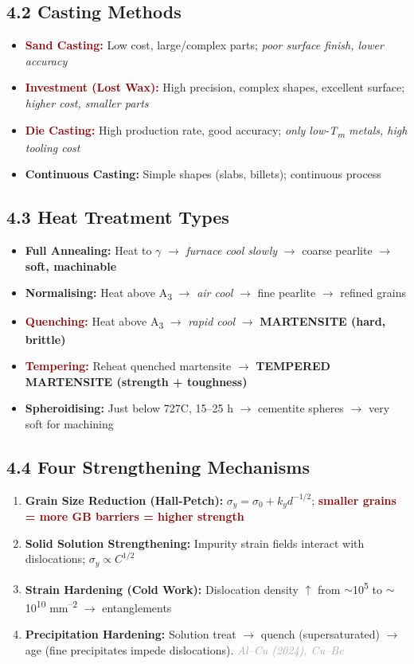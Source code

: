 \documentclass[11pt,a4paper]{article}
\newcommand{\mysubsec}[1]{\subsection*{#1}}
\newcommand{\CRIT}[1]{\textcolor{DarkRed}{\textbf{#1}}}
\newcommand{\KEY}[1]{\textcolor{SecondaryDark}{\textbf{#1}}}
\newcommand{\EXA}[1]{\textcolor{DarkGray}{\textit{#1}}}
\begin{document}
\mysubsec{4.2 Casting Methods}
\begin{itemize}[leftmargin=*,nosep]
    \item \CRIT{Sand Casting:} Low cost, large/complex parts; \textit{poor surface finish, lower accuracy}
    \item \CRIT{Investment (Lost Wax):} High precision, complex shapes, excellent surface; \textit{higher cost, smaller parts}
    \item \CRIT{Die Casting:} High production rate, good accuracy; \textit{only low-T\textsubscript{m} metals, high tooling cost}
    \item \textbf{Continuous Casting:} Simple shapes (slabs, billets); continuous process
\end{itemize}

\mysubsec{4.3 Heat Treatment Types}
\begin{itemize}[leftmargin=*,nosep]
    \item \KEY{Full Annealing:} Heat to $\gamma$ $\to$ \textit{furnace cool slowly} $\to$ coarse pearlite $\to$ \textbf{soft, machinable}
    \item \KEY{Normalising:} Heat above A\textsubscript{3} $\to$ \textit{air cool} $\to$ fine pearlite $\to$ refined grains
    \item \CRIT{Quenching:} Heat above A\textsubscript{3} $\to$ \textit{rapid cool} $\to$ \textbf{MARTENSITE (hard, brittle)}
    \item \CRIT{Tempering:} Reheat quenched martensite $\to$ \textbf{TEMPERED MARTENSITE (strength + toughness)}
    \item \KEY{Spheroidising:} Just below 727\textdegree C, 15--25 h $\to$ cementite spheres $\to$ very soft for machining
\end{itemize}

\mysubsec{4.4 Four Strengthening Mechanisms}
\begin{enumerate}[leftmargin=*,nosep]
    \item \KEY{Grain Size Reduction (Hall-Petch):} $\sigma_y = \sigma_0 + k_y d^{-1/2}$; \CRIT{smaller grains = more GB barriers = higher strength}
    \item \KEY{Solid Solution Strengthening:} Impurity strain fields interact with dislocations; $\sigma_y \propto C^{1/2}$
    \item \KEY{Strain Hardening (Cold Work):} Dislocation density $\uparrow$ from $\sim$10\textsuperscript{5} to $\sim$10\textsuperscript{10} mm\textsuperscript{--2} $\to$ entanglements
    \item \KEY{Precipitation Hardening:} Solution treat $\to$ quench (supersaturated) $\to$ age (fine precipitates impede dislocations). \EXA{Al--Cu (2024), Cu--Be}
\end{enumerate}
\end{document}
